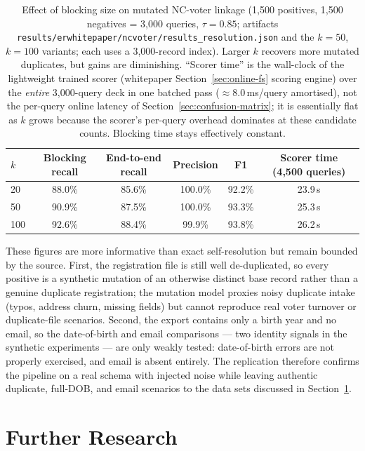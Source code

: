 \documentclass[11pt]{article}
\begin{document}
\begin{table}[h]
\centering
\caption{Effect of blocking size on mutated NC-voter linkage (1{,}500 positives, 1{,}500 negatives = 3{,}000 queries, $\tau=0.85$; artifacts \texttt{results/erwhitepaper/ncvoter/results\_resolution.json} and the $k{=}50$, $k{=}100$ variants; each uses a 3{,}000-record index). Larger $k$ recovers more mutated duplicates, but gains are diminishing. ``Scorer time'' is the wall-clock of the lightweight trained scorer (whitepaper Section~\ref{sec:online-fs} scoring engine) over the \emph{entire} 3{,}000-query deck in one batched pass ($\approx 8.0$\,ms/query amortised), not the per-query online latency of Section~\ref{sec:confusion-matrix}; it is essentially flat as $k$ grows because the scorer's per-query overhead dominates at these candidate counts. Blocking time stays effectively constant.}
\label{tab:ncvoter-k}
\begin{tabular}{lccccc}
\toprule
$k$ & Blocking recall & End-to-end recall & Precision & F1 & Scorer time (4{,}500 queries) \\
\midrule
20 & 88.0\% & 85.6\% & 100.0\% & 92.2\% & 23.9\,s \\
50 & 90.9\% & 87.5\% & 100.0\% & 93.3\% & 25.3\,s \\
100 & 92.6\% & 88.4\% & 99.9\% & 93.8\% & 26.2\,s \\
\bottomrule
\end{tabular}
\end{table}

These figures are more informative than exact self-resolution but remain bounded by the source. First, the registration file is still well de-duplicated, so every positive is a synthetic mutation of an otherwise distinct base record rather than a genuine duplicate registration; the mutation model proxies noisy duplicate intake (typos, address churn, missing fields) but cannot reproduce real voter turnover or duplicate-file scenarios. Second, the export contains only a birth year and no email, so the date-of-birth and email comparisons --- two identity signals in the synthetic experiments --- are only weakly tested: date-of-birth errors are not properly exercised, and email is absent entirely. The replication therefore confirms the pipeline on a real schema with injected noise while leaving authentic duplicate, full-DOB, and email scenarios to the data sets discussed in Section~\ref{sec:further-research}.

\section{Further Research}
\label{sec:further-research}
\end{document}
